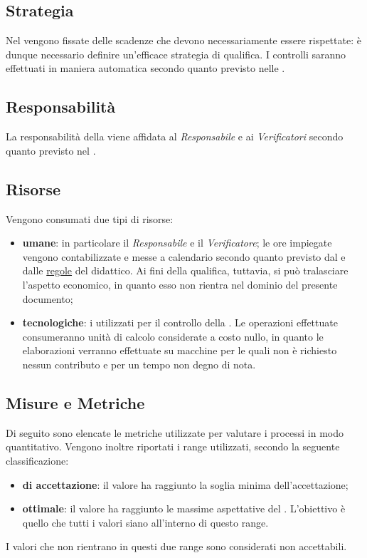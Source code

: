 \subsection{Strategia}
Nel \PianoDiProgetto vengono fissate delle scadenze che devono necessariamente essere rispettate: è dunque necessario definire un'efficace strategia di qualifica. I controlli saranno effettuati in maniera automatica secondo quanto previsto nelle \NormeDiProgetto. 

\subsection{Responsabilità}
La responsabilità della  viene affidata al \textit{Responsabile} e ai \textit{Verificatori} secondo quanto previsto nel \PianoDiProgetto.

\subsection{Risorse}
Vengono consumati due tipi di risorse:
\begin{itemize}
	\item \textbf{umane}: in particolare il \textit{Responsabile} e il \textit{Verificatore}; le ore impiegate vengono contabilizzate e messe a calendario secondo quanto previsto dal \PianoDiProgetto e dalle \href{http://www.math.unipd.it/~tullio/IS-1/2015/Dispense/PD01.pdf}{regole} del  didattico. Ai fini della qualifica, tuttavia, si può tralasciare l'aspetto economico, in quanto esso non rientra nel dominio del presente documento;
		\item \textbf{tecnologiche}: i  utilizzati per il controllo della . Le operazioni effettuate  consumeranno unità di calcolo considerate a costo nullo, in quanto le elaborazioni verranno effettuate su macchine per le quali non è richiesto nessun contributo e per un tempo non degno di nota.
\end{itemize}

\subsection{Misure e Metriche}\label{MisureMetriche}
Di seguito sono elencate le metriche utilizzate per valutare i processi in modo quantitativo. Vengono inoltre riportati i range utilizzati, secondo la seguente classificazione:
\begin{itemize}
	\item \textbf{di accettazione}: il valore ha raggiunto la soglia minima dell'accettazione;
	\item \textbf{ottimale}: il valore ha raggiunto le massime aspettative del . L'obiettivo è quello che tutti i valori siano all'interno di questo range.
\end{itemize}
I valori che non rientrano in questi due range sono considerati non accettabili.


